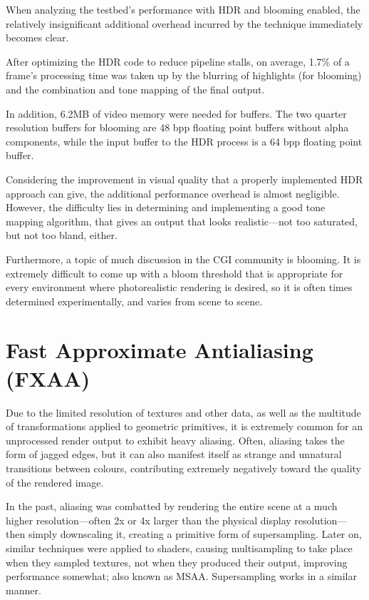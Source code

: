 \documentclass[11pt, oneside]{report}
\begin{document}
When analyzing the testbed's performance with \gls{HDR} and blooming enabled, the relatively insignificant additional overhead incurred by the technique immediately becomes clear.

After optimizing the \gls{HDR} code to reduce \glspl{pipeline stall}, on average, 1.7\% of a frame's processing time was taken up by the blurring of highlights (for blooming) and the combination and \gls{tone mapping} of the final output.

In addition, 6.2MB of video memory were needed for buffers. The two quarter resolution buffers for blooming are 48 \gls{bpp} floating point buffers without alpha components, while the input buffer to the HDR process is a 64 \gls{bpp} floating point buffer.

Considering the improvement in visual quality that a properly implemented \gls{HDR} approach can give, the additional performance overhead is almost negligible. However, the difficulty lies in determining and implementing a good \gls{tone mapping} algorithm, that gives an output that looks realistic---not too saturated, but not too bland, either.

Furthermore, a topic of much discussion in the CGI community is blooming. It is extremely difficult to come up with a bloom threshold that is appropriate for every environment where photorealistic rendering is desired, so it is often times determined experimentally, and varies from scene to scene.

\chapter{Fast Approximate Antialiasing (FXAA)}
Due to the limited resolution of textures and other data, as well as the multitude of transformations applied to geometric primitives, it is extremely common for an unprocessed render output to exhibit heavy \gls{aliasing}. Often, \gls{aliasing} takes the form of jagged edges, but it can also manifest itself as strange and unnatural transitions between colours, contributing extremely negatively toward the quality of the rendered image.

In the past, aliasing was combatted by rendering the entire scene at a much higher resolution---often 2x or 4x larger than the physical display resolution---then simply downscaling it, creating a primitive form of \gls{supersampling}. Later on, similar techniques were applied to \glspl{shader}, causing \gls{multisampling} to take place when they sampled textures, not when they produced their output, improving performance somewhat; also known as MSAA. Supersampling works in a similar manner.
\end{document}
